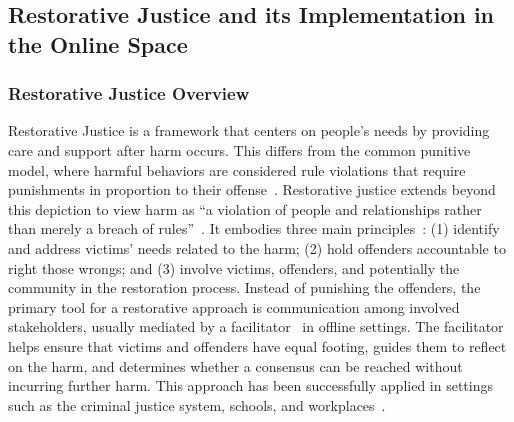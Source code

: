 \subsection{Restorative Justice and its Implementation in the Online Space}
\subsubsection{Restorative Justice Overview}
Restorative Justice is a framework that centers on people’s needs by providing care and support after harm occurs. This differs from the common punitive model, where harmful behaviors are considered rule violations that require punishments in proportion to their offense~\cite{Szablowinski2008}. Restorative justice extends beyond this depiction to view harm as “a violation of people and relationships rather than merely a breach of rules”~\cite{Ness2016}. It embodies three main principles~\cite{Mccold2000}: (1) identify and address victims' needs related to the harm; (2) hold offenders accountable to right those wrongs; and (3) involve victims, offenders, and potentially the community in the restoration process. Instead of punishing the offenders, the primary tool for a restorative approach is communication among involved stakeholders, usually mediated by a facilitator~\cite{Bolitho2017} in offline settings. The facilitator helps ensure that victims and offenders have equal footing, guides them to reflect on the harm, and determines whether a consensus can be reached without incurring further harm. This approach has been successfully applied in settings such as the criminal justice system, schools, and workplaces~\cite{Ness2016, Wood2016}.

